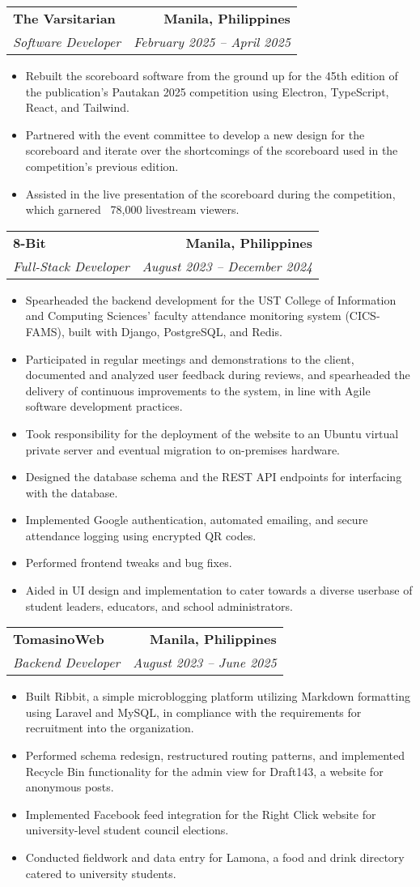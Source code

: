\documentclass[letterpaper,11pt]{article}
\makeatletter
\newcommand{\resumeItem}[1]{
  \item\small{
    {#1 \vspace{-2pt}}
  }
}
\newcommand{\resumeSubheading}[4]{
  \vspace{-2pt}\item
    \begin{tabular*}{1.0\textwidth}[t]{l@{\extracolsep{\fill}}r}
      \textbf{#1} & \textbf{\small #2} \\
      \textit{\small#3} & \textit{\small #4} \\
    \end{tabular*}\vspace{-7pt}
}
\newcommand{\resumeItemListStart}{\begin{itemize}}
\newcommand{\resumeItemListEnd}{\end{itemize}\vspace{-5pt}}
\makeatother
\begin{document}
    \resumeSubheading
      {The Varsitarian}{Manila, Philippines}
      {Software Developer}{February 2025 -- April 2025}
      \resumeItemListStart
        \resumeItem{Rebuilt the scoreboard software from the ground up for the 45th edition of the publication's Pautakan 2025 competition using Electron, TypeScript, React, and Tailwind.}
        \resumeItem{Partnered with the event committee to develop a new design for the scoreboard and iterate over the shortcomings of the scoreboard used in the competition's previous edition.}
        \resumeItem{Assisted in the live presentation of the scoreboard during the competition, which garnered ~78,000 livestream viewers.}
      \resumeItemListEnd

    \resumeSubheading
      {8-Bit}{Manila, Philippines}
      {Full-Stack Developer}{August 2023 -- December 2024}
      \resumeItemListStart
        \resumeItem{Spearheaded the backend development for the UST College of Information and Computing Sciences' faculty attendance monitoring system (CICS-FAMS), built with Django, PostgreSQL, and Redis.}
        \resumeItem{Participated in regular meetings and demonstrations to the client, documented and analyzed user feedback during reviews, and spearheaded the delivery of continuous improvements to the system, in line with Agile software development practices.}
        \resumeItem{Took responsibility for the deployment of the website to an Ubuntu virtual private server and eventual migration to on-premises hardware.}
        \resumeItem{Designed the database schema and the REST API endpoints for interfacing with the database.}
        \resumeItem{Implemented Google authentication, automated emailing, and secure attendance logging using encrypted QR codes.}
        \resumeItem{Performed frontend tweaks and bug fixes.}
        \resumeItem{Aided in UI design and implementation to cater towards a diverse userbase of student leaders, educators, and school administrators.}
      \resumeItemListEnd

    \resumeSubheading
      {TomasinoWeb}{Manila, Philippines}
      {Backend Developer}{August 2023 -- June 2025}
      \resumeItemListStart
        \resumeItem{Built Ribbit, a simple microblogging platform utilizing Markdown formatting using Laravel and MySQL, in compliance with the requirements for recruitment into the organization.}
        \resumeItem{Performed schema redesign, restructured routing patterns, and implemented Recycle Bin functionality for the admin view for Draft143, a website for anonymous posts.}
        \resumeItem{Implemented Facebook feed integration for the Right Click website for university-level student council elections.}
        \resumeItem{Conducted fieldwork and data entry for Lamona, a food and drink directory catered to university students.}
      \resumeItemListEnd
\end{document}
